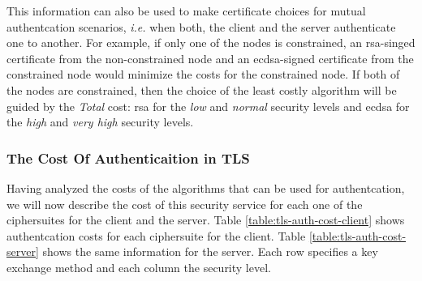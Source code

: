 \documentclass{llncs}
\begin{document}
This information can also be used to make
certificate choices for mutual authentcation scenarios, \textit{i.e.} when both, the client and the server authenticate one to another.
For example, if only one of the nodes is constrained, an \gls{rsa}-singed certificate from the non-constrained node and an \gls{ecdsa}-signed
certificate from the constrained node would minimize the costs for the constrained node. If both of the nodes are constrained, then the
choice of the least costly algorithm will be guided by the \textit{Total} cost: \gls{rsa} for the \textit{low} and \textit{normal}
security levels and \gls{ecdsa} for the \textit{high} and \textit{very high} security levels.

\subsubsection{The Cost Of Authenticaition in TLS}

Having analyzed the costs of the algorithms that can be used for authentcation, we will now describe the cost of this security service
for each one of the ciphersuites for the client and the server. Table \ref{table:tls-auth-cost-client} shows authentcation costs for each
ciphersuite for the client. Table \ref{table:tls-auth-cost-server} shows the same information for the server. Each row specifies a key
exchange method and each column the security level.
\end{document}
